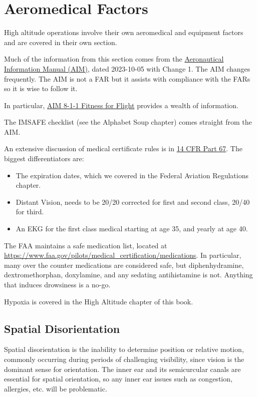 \chapter{Aeromedical Factors}

High altitude operations involve their own aeromedical and equipment factors and are covered in their own section.

Much of the information from this section comes from the \href{https://www.faa.gov/air_traffic/publications/atpubs/aim_html/index.html}{Aeronautical Information Manual (AIM)}, dated 2023-10-05 with Change 1. The AIM changes frequently. The AIM is not a FAR but it assists with compliance with the FARs so it is wise to follow it.

In particular, \href{https://www.faa.gov/air_traffic/publications/atpubs/aim_html/chap8_section_1.html}{AIM 8-1-1 Fitness for Flight} provides a wealth of information.

The IMSAFE checklist (see the Alphabet Soup chapter) comes straight from the AIM.

An extensive discussion of medical certificate rules is in \href{https://www.ecfr.gov/current/title-14/chapter-I/subchapter-D/part-67}{14 CFR Part 67}. The biggest differentiators are:

\begin{itemize}
\item The expiration dates, which we covered in the Federal Aviation Regulations chapter.
\item Distant Vision, needs to be 20/20 corrected for first and second class, 20/40 for third.
\item An EKG for the first class medical starting at age 35, and yearly at age 40.
\end{itemize}

The FAA maintains a safe medication list, located at \url{https://www.faa.gov/pilots/medical_certification/medications}. In particular, many over the counter medications are considered safe, but diphenhydramine, dextromethorphan, doxylamine, and any sedating antihistamine is not. Anything that induces drowsiness is a no-go.

Hypoxia is covered in the High Altitude chapter of this book.

\section{Spatial Disorientation}

Spatial disorientation is the inability to determine position or relative motion, commonly occurring during periods of challenging visibility, since vision is the dominant sense for orientation. The inner ear and its semicurcular canals are essential for spatial orientation, so any inner ear issues such as congestion, allergies, etc. will be problematic.

